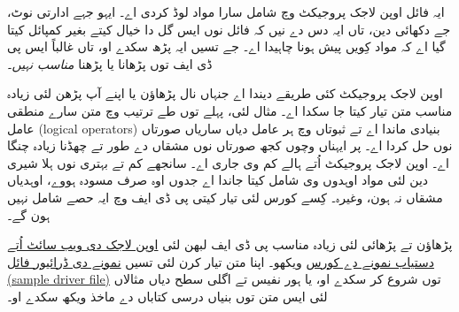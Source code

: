 \documentclass[../include/open-logic-part]{subfiles}
\begin{document}
\clearpage

\begin{editorial}
ایہ فائل اوپن لاجک پروجیکٹ وچ شامل سارا مواد لوڈ کردی اے۔ ایہو جہے
ادارتی نوٹ، جے دکھائی دین، تاں ایہ دس دے نیں کہ فائل نوں ایس گل دا
خیال کیتے بغیر کمپائل کیتا گیا اے کہ مواد کِویں پیش ہونا چاہیدا اے۔
جے تسیں ایہ پڑھ سکدے او، تاں غالباً ایس پی ڈی ایف توں پڑھانا یا پڑھنا
\emph{مناسب نہیں}۔

اوپن لاجک پروجیکٹ کئی طریقے دیندا اے جنہاں نال پڑھاؤن یا اپنے آپ
پڑھن لئی زیادہ مناسب متن تیار کیتا جا سکدا اے۔ مثال لئی، پہلے توں طے
ترتیب وچ متن سارے منطقی عامل (logical operators) بنیادی ماندا اے تے ثبوتاں وچ ہر عامل
دیاں ساریاں صورتاں نوں حل کردا اے۔ پر ایہناں وچوں کجھ صورتاں نوں مشقاں
دے طور تے چھڈنا زیادہ چنگا اے۔ اوپن لاجک پروجیکٹ اُتے ہالے کم وی جاری
اے۔ سانجھے کم تے بہتری نوں ہلا شیری دین لئی مواد اوہدوں وی شامل کیتا
جاندا اے جدوں اوہ صرف مسودہ ہووے، اوہدیاں مشقاں نہ ہون، وغیرہ۔ کِسے
کورس لئی تیار کیتی پی ڈی ایف وچ ایہ حصے شامل نہیں ہون گے۔

پڑھاؤن تے پڑھائی لئی زیادہ مناسب پی ڈی ایف لبھن لئی
\href{http://builds.openlogicproject.org/}{اوپن لاجک دی ویب سائٹ اُتے دستیاب نمونے دے کورس}
ویکھو۔ اپنا متن تیار کرن لئی تسیں
\href{https://github.com/OpenLogicProject/OpenLogic/tree/master/courses/sample}{نمونے دی ڈرائیور فائل (sample driver file)}
توں شروع کر سکدے او، یا ہور نفیس تے اگلی سطح دیاں مثالاں لئی ایس متن
توں بنیاں درسی کتاباں دے ماخذ ویکھ سکدے او۔
\end{editorial}


















\end{document}
